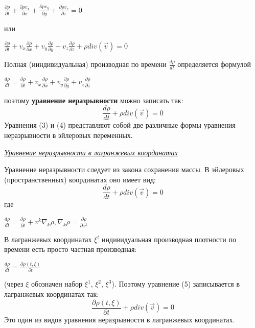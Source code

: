 \begin{center}$
\frac{\partial \rho}{\partial t} + \frac{\partial \rho v_x}{\partial x} + \frac{\partial \rho v_y}{\partial y} + \frac{\partial \rho v_z}{\partial z} = 0
$\end{center}
или
\begin{center}$
\frac{\partial \rho}{\partial t} + v_x \frac{\partial \rho}{\partial x} + v_y \frac{\partial \rho}{\partial y} + v_z \frac{\partial \rho}{\partial z} + \rho div (\Vec{v}) = 0
$\end{center}
Полная (ииндивидуальная) производная по времени $\frac{d \rho}{d t}$ определяется формулой
\begin{center}$
\frac{d \rho}{d t} = \frac{\partial \rho}{\partial t} + v_x \frac{\partial \rho}{\partial x} + v_y \frac{\partial \rho}{\partial y} + v_z \frac{\partial \rho}{\partial z}
$\end{center}
поэтому \textbf{уравнение неразрывности} можно записать так:
\begin{equation}
    \frac{d \rho}{d t} + \rho div(\Vec{v}) = 0
\end{equation}
Уравнения (3) и (4) представляют собой две различные формы уравнения неразрывности в эйлеровых переменных.

\begin{center}
    \textit{\underline{Уравнение неразрывности в лагранжевых координатах}}
\end{center}
Уравнение неразрывности следует из закона сохранения массы. В эйлеровых (пространственных) координатах оно имеет вид:
\begin{equation}
    \frac{d \rho}{d t} + \rho div(\Vec{v}) = 0
\end{equation}
где
\begin{center}$
\frac{d \rho}{d t} = \frac{\partial \rho}{\partial t} + v^k \nabla_k \rho,
\nabla_k \rho = \frac{\partial \rho}{\partial x^k}
$\end{center}
В лагранжевых координатах $\xi^i$ индивидуальная производная плотности по времени есть просто частная производная:
\begin{center}$
\frac{d \rho}{d t}  = \frac{\partial \rho (t, \xi)}{\partial t}
$\end{center}
(через $\xi$ обозначен набор $\xi^1$, $\xi^2$, $\xi^3$). Поэтому уравнение (5) записывается в лагранжевых координатах так:
\begin{equation}
    \frac{\partial \rho (t, \xi)}{\partial t} + \rho div(\Vec{v}) = 0
\end{equation}
Это один из видов уравнения неразрывности в лагранжевых координатах.
